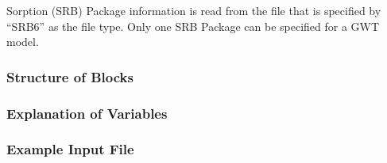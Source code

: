 Sorption (SRB) Package information is read from the file that is specified by ``SRB6'' as the file type.  Only one SRB Package can be specified for a GWT model. 

\vspace{5mm}
\subsubsection{Structure of Blocks}



\vspace{5mm}
\subsubsection{Explanation of Variables}
\begin{description}

\end{description}

\vspace{5mm}
\subsubsection{Example Input File}


